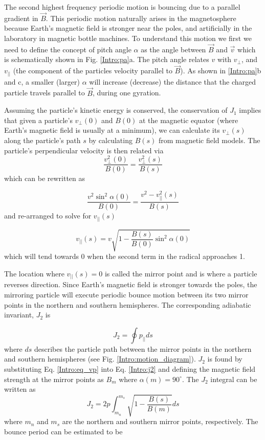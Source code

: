 The second highest frequency periodic motion is bouncing due to a parallel gradient in $\vec{B}$. This periodic motion naturally arises in the magnetosphere because Earth's magnetic field is stronger near the poles, and artificially in the laboratory in magnetic bottle machines. To understand this motion we first we need to define the concept of pitch angle $\alpha$ as the angle between $\vec{B}$ and $\vec{v}$ which is schematically shown in Fig. \ref{Intro:pa}a. The pitch angle relates $v$ with $v_\perp$, and $v_{||}$ (the component of the particles velocity parallel to $\vec{B}$). As shown in \ref{Intro:pa}b and c, a smaller (larger) $\alpha$ will increase (decrease) the distance that the charged particle travels parallel to $\vec{B}$, during one gyration.

Assuming the particle's kinetic energy is conserved, the conservation of $J_1$ implies that given a particle's $v_\perp(0)$ and $B(0)$ at the magnetic equator (where Earth's magnetic field is usually at a minimum), we can calculate its $v_\perp(s)$ along the particle's path $s$ by calculating $B(s)$ from magnetic field models. The particle's perpendicular velocity is then related via
\begin{equation}
\frac{v_\perp^2 (0)}{B(0)} = \frac{v_\perp^2 (s)}{B(s)}
\end{equation} which can be rewritten as 

\begin{equation}
\frac{v^2 \sin^2{\alpha(0)}}{B(0)} = \frac{v^2 - v^2_{||}(s)}{B(s)}
\end{equation} and re-arranged to solve for $v_{||}(s)$

\begin{equation} \label{Intro:eq_vp} 
v_{||}(s) = v \sqrt{1 - \frac{B(s)}{B(0)} \sin^2{\alpha(0)}}
\end{equation} which will tend towards 0 when the second term in the radical approaches 1.

The location where $v_{||}(s) = 0$ is called the mirror point and is where a particle reverses direction. Since Earth's magnetic field is stronger towards the poles, the mirroring particle will execute periodic bounce motion between its two mirror points in the northern and southern hemispheres. The corresponding adiabatic invariant, $J_2$ is

\begin{equation} \label{Intro:j2}
J_2 = \oint p_{||} ds
\end{equation} where $ds$ describes the particle path between the mirror points in the northern and southern hemispheres (see Fig. \ref{Intro:motion_diagram}). $J_2$ is found by substituting Eq. \ref{Intro:eq_vp} into Eq. \ref{Intro:j2} and defining the magnetic field strength at the mirror points as $B_m$ where $\alpha(m) = 90^\circ$. The $J_2$ integral can be written as     
\begin{equation}
J_2 = 2 p \int_{m_n}^{m_s} \sqrt{1 - \frac{B(s)}{B(m)}} ds
\end{equation} where $m_n$ and $m_s$ are the northern and southern mirror points, respectively. The bounce period can be estimated \citep[e.g.][]{Baumjohann1997} to be 

